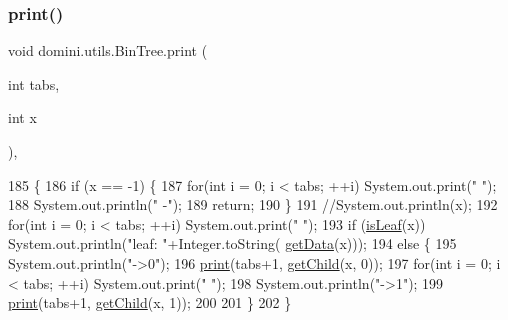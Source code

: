\subsubsection{\texorpdfstring{print()}{print()}\hspace{0.1cm}{\footnotesize\ttfamily [1/2]}}
{\footnotesize\ttfamily void domini.\+utils.\+Bin\+Tree.\+print (\begin{DoxyParamCaption}\item[{int}]{tabs,  }\item[{int}]{x }\end{DoxyParamCaption})\hspace{0.3cm}{\ttfamily [inline]}, {\ttfamily [private]}}


\begin{DoxyCode}
185                                         \{
186         \textcolor{keywordflow}{if} (x == -1) \{
187             \textcolor{keywordflow}{for}(\textcolor{keywordtype}{int} i = 0; i < tabs; ++i) System.out.print(\textcolor{stringliteral}{"  "});
188             System.out.println(\textcolor{stringliteral}{" -"});
189             \textcolor{keywordflow}{return};
190         \}
191         \textcolor{comment}{//System.out.println(x);}
192         \textcolor{keywordflow}{for}(\textcolor{keywordtype}{int} i = 0; i < tabs; ++i) System.out.print(\textcolor{stringliteral}{"  "});
193         \textcolor{keywordflow}{if} (\hyperlink{classdomini_1_1utils_1_1BinTree_a37030e961f5613a5c74984ac002d965b}{isLeaf}(x)) System.out.println(\textcolor{stringliteral}{"leaf: "}+Integer.toString(
      \hyperlink{classdomini_1_1utils_1_1BinTree_ad8734786aa8ba40815e4b782264aef64}{getData}(x)));
194         \textcolor{keywordflow}{else} \{
195             System.out.println(\textcolor{stringliteral}{"->0"});
196             \hyperlink{classdomini_1_1utils_1_1BinTree_a0dc4daeb2d0e221cc8fc702d1d0ec795}{print}(tabs+1, \hyperlink{classdomini_1_1utils_1_1BinTree_aee1ed36b9433869f94a6ee8a6815d872}{getChild}(x, 0));
197             \textcolor{keywordflow}{for}(\textcolor{keywordtype}{int} i = 0; i < tabs; ++i) System.out.print(\textcolor{stringliteral}{"  "});
198             System.out.println(\textcolor{stringliteral}{"->1"});
199             \hyperlink{classdomini_1_1utils_1_1BinTree_a0dc4daeb2d0e221cc8fc702d1d0ec795}{print}(tabs+1, \hyperlink{classdomini_1_1utils_1_1BinTree_aee1ed36b9433869f94a6ee8a6815d872}{getChild}(x, 1));
200 
201         \}
202     \}
\end{DoxyCode}
\mbox{\label{classdomini_1_1utils_1_1BinTree_a0dc4daeb2d0e221cc8fc702d1d0ec795}} 
